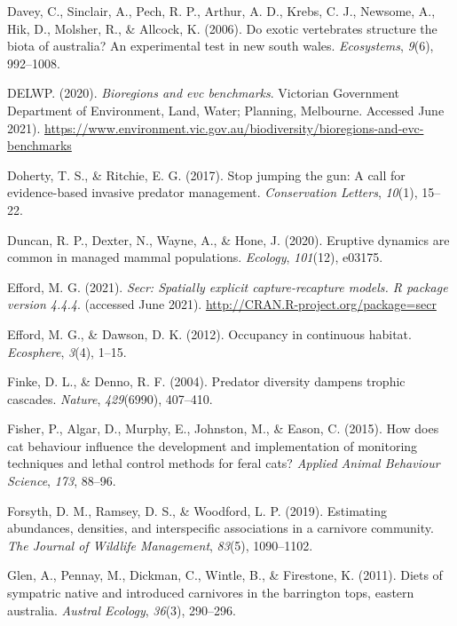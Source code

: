 \documentclass[]{elsarticle} %
\begin{document}
\leavevmode\hypertarget{ref-davey2006}{}%
Davey, C., Sinclair, A., Pech, R. P., Arthur, A. D., Krebs, C. J., Newsome, A., Hik, D., Molsher, R., \& Allcock, K. (2006). Do exotic vertebrates structure the biota of australia? An experimental test in new south wales. \emph{Ecosystems}, \emph{9}(6), 992--1008.

\leavevmode\hypertarget{ref-delwp2020}{}%
DELWP. (2020). \emph{Bioregions and evc benchmarks}. Victorian Government Department of Environment, Land, Water; Planning, Melbourne. Accessed June 2021). \url{https://www.environment.vic.gov.au/biodiversity/bioregions-and-evc-benchmarks}

\leavevmode\hypertarget{ref-doherty2017}{}%
Doherty, T. S., \& Ritchie, E. G. (2017). Stop jumping the gun: A call for evidence-based invasive predator management. \emph{Conservation Letters}, \emph{10}(1), 15--22.

\leavevmode\hypertarget{ref-duncan2020eruptive}{}%
Duncan, R. P., Dexter, N., Wayne, A., \& Hone, J. (2020). Eruptive dynamics are common in managed mammal populations. \emph{Ecology}, \emph{101}(12), e03175.

\leavevmode\hypertarget{ref-efford2021secr}{}%
Efford, M. G. (2021). \emph{Secr: Spatially explicit capture-recapture models. R package version 4.4.4}. (accessed June 2021). \url{http://CRAN.R-project.org/package=secr}

\leavevmode\hypertarget{ref-efford2012}{}%
Efford, M. G., \& Dawson, D. K. (2012). Occupancy in continuous habitat. \emph{Ecosphere}, \emph{3}(4), 1--15.

\leavevmode\hypertarget{ref-finke2004}{}%
Finke, D. L., \& Denno, R. F. (2004). Predator diversity dampens trophic cascades. \emph{Nature}, \emph{429}(6990), 407--410.

\leavevmode\hypertarget{ref-fisher2015}{}%
Fisher, P., Algar, D., Murphy, E., Johnston, M., \& Eason, C. (2015). How does cat behaviour influence the development and implementation of monitoring techniques and lethal control methods for feral cats? \emph{Applied Animal Behaviour Science}, \emph{173}, 88--96.

\leavevmode\hypertarget{ref-forsyth2019}{}%
Forsyth, D. M., Ramsey, D. S., \& Woodford, L. P. (2019). Estimating abundances, densities, and interspecific associations in a carnivore community. \emph{The Journal of Wildlife Management}, \emph{83}(5), 1090--1102.

\leavevmode\hypertarget{ref-glen2011}{}%
Glen, A., Pennay, M., Dickman, C., Wintle, B., \& Firestone, K. (2011). Diets of sympatric native and introduced carnivores in the barrington tops, eastern australia. \emph{Austral Ecology}, \emph{36}(3), 290--296.
\end{document}
